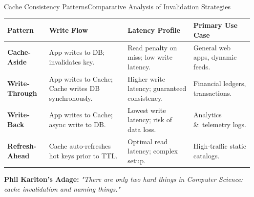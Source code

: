 \documentclass[aspectratio=169, 10pt]{beamer}
\begin{document}
\begin{frame}{Cache Consistency Patterns}{Comparative Analysis of Invalidation Strategies}
  \vspace*{-0.3cm}
  \begin{center}
    \fontsize{8pt}{9.5pt}\selectfont
    \begin{tabularx}{\textwidth}{l X X X}
      \toprule
      \rowcolor{NordicDark}
      \color{white}\textbf{Pattern} & \color{white}\textbf{Write Flow} & \color{white}\textbf{Latency Profile} & \color{white}\textbf{Primary Use Case} \\
      \midrule
      \textbf{Cache-Aside} & App writes to DB; invalidates key. & Read penalty on miss; low write latency. & General web apps, dynamic feeds. \\
      \textbf{Write-Through} & App writes to Cache; Cache writes DB synchronously. & Higher write latency; guaranteed consistency. & Financial ledgers, transactions. \\
      \textbf{Write-Back} & App writes to Cache; async write to DB. & Lowest write latency; risk of data loss. & Analytics \&\ telemetry logs. \\
      \textbf{Refresh-Ahead} & Cache auto-refreshes hot keys prior to TTL. & Optimal read latency; complex setup. & High-traffic static catalogs. \\
      \bottomrule
    \end{tabularx}
  \end{center}

  \vspace*{0.05cm}
  \begin{tcolorbox}[nordiccard]
    {\color{NordicDark}\bfseries Phil Karlton's Adage:} \textit{"There are only two hard things in Computer Science: cache invalidation and naming things."}
  \end{tcolorbox}
\end{frame}
\end{document}
